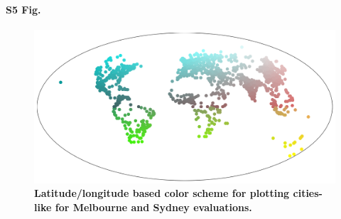 \documentclass[10pt,letterpaper]{article}
\begin{document}
\paragraph*{S5 Fig.}
\begin{figure}[!htbp]
\centering    
\includegraphics[scale=0.25]{Images/PlosOne/Fig5.png} 
\caption{\bf Latitude/longitude based color scheme for plotting cities-like for Melbourne and Sydney evaluations.}    
 \label{fig:colorscheme}  
\end{figure} 
\end{document}
